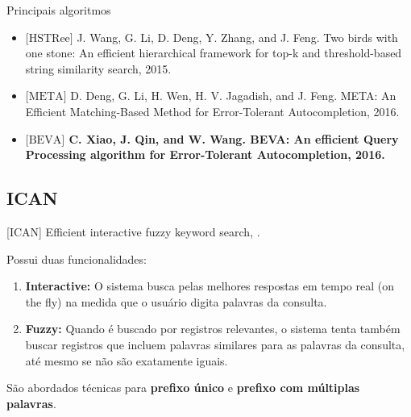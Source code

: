 \documentclass[11pt]{beamer}
\begin{document}
\begin{frame}{Principais algoritmos}
    
   \begin{itemize}
		\item $\big[ \text{HSTRee} \big]$ J. Wang, G. Li, D. Deng, Y. Zhang, and J. Feng. Two birds with one stone: An efficient hierarchical framework for top-k and threshold-based string similarity search, 2015.
		\item $\big[ \text{META} \big]$ D. Deng, G. Li, H. Wen, H. V. Jagadish, and J. Feng. META: An Efficient Matching-Based Method for Error-Tolerant Autocompletion, 2016.
        \item \textbf{$\big[ \text{BEVA} \big]$ C. Xiao, J. Qin, and W. Wang. BEVA: An efficient Query Processing algorithm for Error-Tolerant Autocompletion, 2016.}
    \end{itemize} 
    
\end{frame}

\subsection{ICAN}

\begin{frame}{[ICAN] Efficient interactive fuzzy keyword search, \cite{ICAN}.}

    Possui duas funcionalidades: 

    \begin{enumerate}
        \item \textbf{Interactive:} O sistema busca pelas melhores respostas em tempo real (on the fly) na medida que o usuário digita palavras da consulta. \pause
        \item \textbf{Fuzzy:} Quando é buscado por registros relevantes, o sistema tenta também buscar registros que incluem palavras similares para as palavras da consulta, até mesmo se não são exatamente iguais. \pause
    \end{enumerate}
    
    São abordados técnicas para \textbf{prefixo único} e \textbf{prefixo com múltiplas palavras}.
    
\end{frame}
\end{document}
